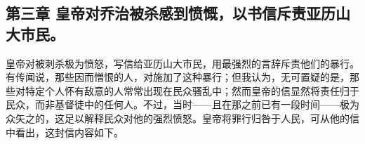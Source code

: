 \subsection{第三章 皇帝对乔治被杀感到愤慨，以书信斥责亚历山大市民。}

皇帝对被刺杀极为愤怒，写信给亚历山大市民，用最强烈的言辞斥责他们的暴行。有传闻说，那些因而憎恨的人，对施加了这种暴行；但我认为，无可置疑的是，那些对特定个人怀有敌意的人常常出现在民众骚乱中；然而皇帝的信显然将责任归于民众，而非基督徒中的任何人。不过，当时——且在那之前已有一段时间——极为众矢之的，这足以解释民众对他的强烈愤怒。皇帝将罪行归咎于人民，可从他的信中看出，这封信内容如下。\par

\par

